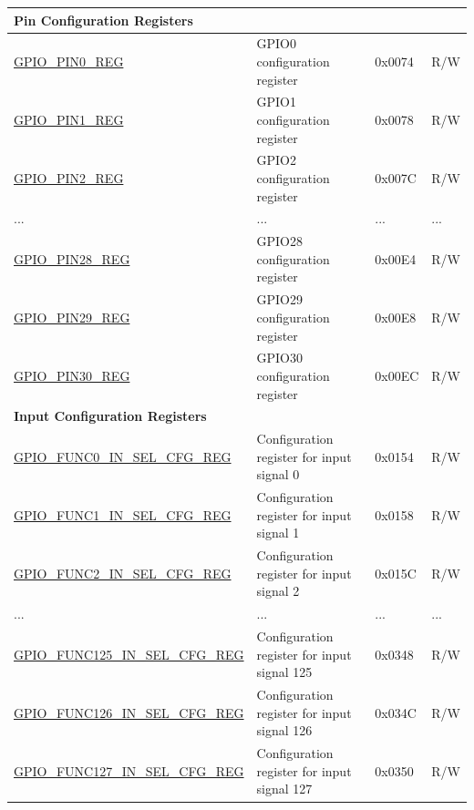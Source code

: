 \begin{longtable}{ | p{5.8cm} | p{7.2cm} | p{1.3cm} | p{2cm} | }
\multicolumn{4}{|l|}{\textbf{Pin Configuration Registers}} \\ \hline
\hyperref[regdesc:GPIOPINNREG]{GPIO\_PIN0\_REG} & GPIO0 configuration register & 0x0074 & R/W \\ \hline
\hyperref[regdesc:GPIOPINNREG]{GPIO\_PIN1\_REG} & GPIO1 configuration register & 0x0078 & R/W \\ \hline
\hyperref[regdesc:GPIOPINNREG]{GPIO\_PIN2\_REG} & GPIO2 configuration register & 0x007C & R/W \\ \hline
...& ... & ... & ... \\ \hline
\hyperref[regdesc:GPIOPINNREG]{GPIO\_PIN28\_REG} & GPIO28 configuration register & 0x00E4 & R/W \\ \hline
\hyperref[regdesc:GPIOPINNREG]{GPIO\_PIN29\_REG} & GPIO29 configuration register & 0x00E8 & R/W \\ \hline
\hyperref[regdesc:GPIOPINNREG]{GPIO\_PIN30\_REG} & GPIO30 configuration register & 0x00EC & R/W \\ \hline




\multicolumn{4}{|l|}{\textbf{Input Configuration Registers}} \\ \hline
\hyperref[regdesc:GPIOFUNCNINSELCFGREG]{GPIO\_FUNC0\_IN\_SEL\_CFG\_REG} & Configuration register for input signal 0 & 0x0154 & R/W \\ \hline
\hyperref[regdesc:GPIOFUNCNINSELCFGREG]{GPIO\_FUNC1\_IN\_SEL\_CFG\_REG} & Configuration register for input signal 1 & 0x0158 & R/W \\ \hline
\hyperref[regdesc:GPIOFUNCNINSELCFGREG]{GPIO\_FUNC2\_IN\_SEL\_CFG\_REG} & Configuration register for input signal 2 & 0x015C & R/W \\ \hline
...& ... & ... & ... \\ \hline
\hyperref[regdesc:GPIOFUNCNINSELCFGREG]{GPIO\_FUNC125\_IN\_SEL\_CFG\_REG} & Configuration register for input signal 125 & 0x0348 & R/W \\ \hline
\hyperref[regdesc:GPIOFUNCNINSELCFGREG]{GPIO\_FUNC126\_IN\_SEL\_CFG\_REG} & Configuration register for input signal 126 & 0x034C & R/W \\ \hline
\hyperref[regdesc:GPIOFUNCNINSELCFGREG]{GPIO\_FUNC127\_IN\_SEL\_CFG\_REG} & Configuration register for input signal 127 & 0x0350 & R/W \\ \hline


\end{longtable}
